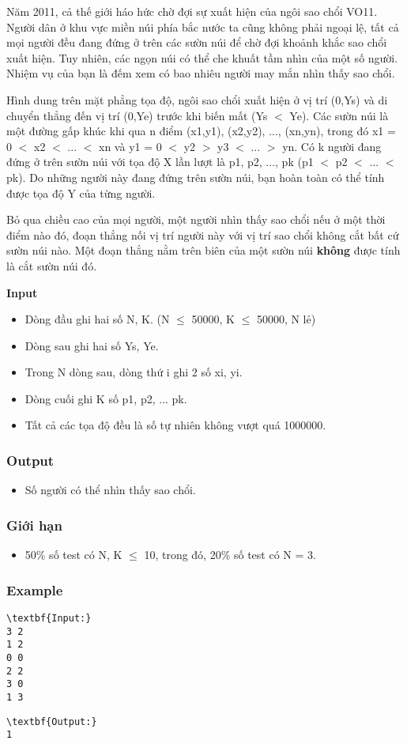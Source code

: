 

Năm 2011, cả thế giới háo hức chờ đợi sự xuất hiện của ngôi sao chổi VO11. Người dân ở khu vực miền núi phía bắc nước ta cũng không phải ngoại lệ, tất cả mọi người đều đang đứng ở trên các sườn núi để chờ đợi khoảnh khắc sao chổi xuất hiện. Tuy nhiên, các ngọn núi có thể che khuất tầm nhìn của một số người. Nhiệm vụ của bạn là đếm xem có bao nhiêu người may mắn nhìn thấy sao chổi.

Hình dung trên mặt phẳng tọa độ, ngôi sao chổi xuất hiện ở vị trí (0,Ys) và di chuyển thẳng đến vị trí (0,Ye) trước khi biến mất (Ys $<$ Ye). Các sườn núi là một đường gấp khúc khi qua n điểm (x1,y1), (x2,y2), ..., (xn,yn), trong đó x1 = 0 $<$ x2 $<$ ... $<$ xn và y1 = 0 $<$ y2 $>$ y3 $<$ ... $>$ yn. Có k người đang đứng ở trên sườn núi với tọa độ X lần lượt là p1, p2, ..., pk (p1 $<$ p2 $<$ ... $<$ pk). Do những người này đang đứng trên sườn núi, bạn hoàn toàn có thể tính được tọa độ Y của từng người.

Bỏ qua chiều cao của mọi người, một người nhìn thấy sao chổi nếu ở một thời điểm nào đó, đoạn thẳng nối vị trí người này với vị trí sao chổi không cắt bất cứ sườn núi nào. Một đoạn thẳng nằm trên biên của một sườn núi \textbf{ không } được tính là cắt sườn núi đó.

\textbf{Input }
\begin{itemize}
	\item Dòng đầu ghi hai số N, K. (N  $\le$  50000, K  $\le$  50000, N lẻ)
	\item Dòng sau ghi hai số Ys, Ye.
	\item Trong N dòng sau, dòng thứ i ghi 2 số xi, yi.
	\item Dòng cuối ghi K số p1, p2, ... pk.
	\item Tất cả các tọa độ đều là số tự nhiên không vượt quá 1000000.
\end{itemize}

\subsubsection{Output}
\begin{itemize}
	\item Số người có thể nhìn thấy sao chổi.
\end{itemize}

\subsubsection{Giới hạn}
\begin{itemize}
	\item 50\% số test có N, K  $\le$  10, trong đó, 20\% số test có N = 3.
\end{itemize}

\subsubsection{Example}
\begin{verbatim}
\textbf{Input:}
3 2
1 2
0 0
2 2
3 0
1 3\end{verbatim}
\begin{verbatim}
\textbf{Output:}
1\end{verbatim}
